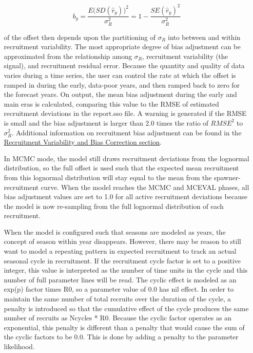 \begin{equation}
	b_y=\frac{E\Big( SD(\hat{r}_y)\Big)^2}{\sigma^2_R}=1-\frac{SE(\hat{r}_y)^2}{\sigma^2_R}
\end{equation}

\noindent of the offset then depends upon the partitioning of $\sigma_R$ into between and within recruitment variability. The most appropriate degree of bias adjustment can be approximated from the relationship among $\sigma_R$, recruitment variability (the signal), and recruitment residual error. Because the quantity and quality of data varies during a time series, the user can control the rate at which the offset is ramped in during the early, data-poor years, and then ramped back to zero for the forecast years. On output, the mean bias adjustment during the early and main eras is calculated, comparing this value to the RMSE of estimated recruitment deviations in the report.sso file. A warning is generated if the RMSE is small and the bias adjustment is larger than 2.0 times the ratio of $RMSE^2$ to $\sigma^2_R$. Additional information on recruitment bias adjustment can be found in the \hyperlink{BiasCorrect}{Recruitment Variability and Bias Correction section}.

In MCMC mode, the model still draws recruitment deviations from the lognormal distribution, so the full offset is used such that the expected mean recruitment from this lognormal distribution will stay equal to the mean from the spawner-recruitment curve. When the model reaches the MCMC and MCEVAL phases, all bias adjustment values are set to 1.0 for all active recruitment deviations because the model is now re-sampling from the full lognormal distribution of each recruitment.

When the model is configured such that seasons are modeled as years, the concept of season within year disappears. However, there may be reason to still want to model a repeating pattern in expected recruitment to track an actual seasonal cycle in recruitment. If the recruitment cycle factor is set to a positive integer, this value is interpreted as the number of time units in the cycle and this number of full parameter lines will be read. The cyclic effect is modeled as an exp(p) factor times R0, so a parameter value of 0.0 has nil effect. In order to maintain the same number of total recruits over the duration of the cycle, a penalty is introduced so that the cumulative effect of the cycle produces the same number of recruits as Ncycles * R0. Because the cyclic factor operates as an exponential, this penalty is different than a penalty that would cause the sum of the cyclic factors to be 0.0. This is done by adding a penalty to the parameter likelihood. %

